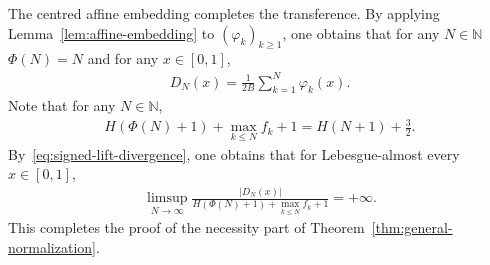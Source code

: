 \documentclass[12pt,reqno]{amsart}
\theoremstyle{definition}
\theoremstyle{plain}
\begin{document}
The centred affine embedding completes the transference. By applying Lemma~\ref{lem:affine-embedding} to $(\varphi_k)_{k\geq1}$, one obtains that for any $N\in\mathbb{N}$ $\Phi(N)=N$ and for any $x\in[0,1]$,
\begin{align*}
    D_N(x)
    =
    \frac{1}{2B}
    \sum_{k=1}^{N}\varphi_k(x).
\end{align*}
Note that for any $N\in\mathbb{N}$,
\begin{align*}
    H(\Phi(N)+1)
    +\max_{k\leq N}f_k
    +1
    =
    H(N+1)+\frac32.
\end{align*}
By~\eqref{eq:signed-lift-divergence}, one obtains that for Lebesgue-almost every $x\in[0,1]$,
\begin{align*}
    \limsup_{N\to\infty}
    \frac{
        |D_N(x)|
    }{
        H(\Phi(N)+1)
        +\max_{k\leq N}f_k
        +1
    }
    =+\infty.
\end{align*}
This completes the proof of the necessity part of Theorem~\ref{thm:general-normalization}.



\end{document}

